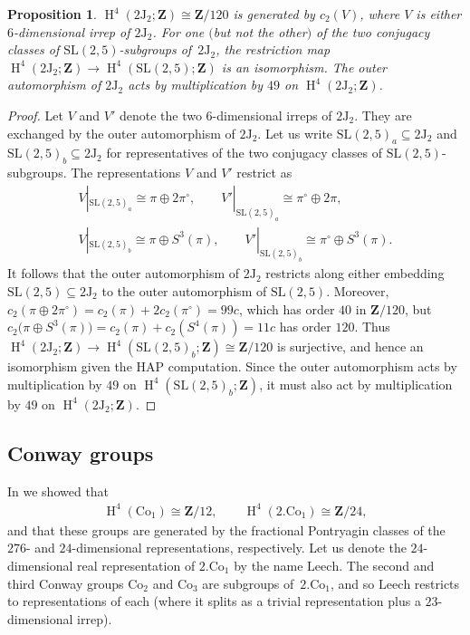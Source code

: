 \documentclass[pdftex]{sigma}
\numberwithin{equation}{section}
\newtheorem{Proposition}[Theorem]{Proposition}
 { \theoremstyle{definition}
\newtheorem{Remark}[Theorem]{Remark} }
\newcommand\bZ{\mathbf Z}
\newcommand\rJ{\mathrm J}
\DeclareMathOperator\homology{H}
\renewcommand\H{\homology}
\newcommand\<\langle
\renewcommand\>\rangle
\newcommand\Co{\mathrm{Co}}
\newcommand\Leech{\mathrm{Leech}}
\newcommand{\SL}{\mathrm{SL}}
\begin{document}
\begin{Proposition} \label{lem:J2} $\H^4(2\rJ_2;\bZ)\cong \bZ/120$ is generated by $c_2(V)$, where $V$ is either $6$-dimensional irrep of $2\rJ_2$. For one $($but not the other$)$ of the two conjugacy classes of $\SL(2,5)$-subgroups of~$2\rJ_2$, the restriction map $\H^4(2\rJ_2;\bZ) \to \H^4(\SL(2,5);\bZ)$ is an isomorphism. The outer automorphism of $2\rJ_2$ acts by multiplication by $49$ on $\H^4(2\rJ_2;\bZ)$.
\end{Proposition}
\begin{proof}

Let $V$ and $V'$ denote the two $6$-dimensional irreps of $2\rJ_2$. They are exchanged by the outer automorphism of $2\rJ_2$. Let us write $\SL(2,5)_a \subseteq 2\rJ_2$ and $\SL(2,5)_b \subseteq 2\rJ_2$ for representatives of the two conjugacy classes of $\SL(2,5)$-subgroups. The representations $V$ and $V'$ restrict as
 \begin{gather*} V|_{\SL(2,5)_a} \cong \pi \oplus 2\pi^{\circ}, \qquad V'|_{\SL(2,5)_a} \cong \pi^{\circ} \oplus 2\pi, \\
 V|_{\SL(2,5)_b} \cong \pi \oplus S^3(\pi), \qquad V'|_{\SL(2,5)_b} \cong \pi^{\circ} \oplus S^3(\pi).\end{gather*}
 It follows that the outer automorphism of $2\rJ_2$ restricts along either embedding $\SL(2,5) \subseteq 2\rJ_2$ to the outer automorphism of $\SL(2,5)$. Moreover, $c_2(\pi \oplus 2\pi^{\circ}) = c_2(\pi) + 2c_2(\pi^{\circ}) = 99c$, which has order $40$ in $\bZ/120$, but $c_2\big(\pi \oplus S^3(\pi)\big) = c_2(\pi) + c_2(S^4(\pi)) = 11 c$ has order $120$. Thus $\H^4(2\rJ_2;\bZ) \to \H^4(\SL(2,5)_b;\bZ) \cong \bZ/120$ is surjective, and hence an isomorphism
 given the HAP computation. Since the outer automorphism acts by multiplication by $49$ on $\H^4(\SL(2,5)_b;\bZ)$, it must also act by multiplication by $49$ on $\H^4(2\rJ_2;\bZ)$.
\end{proof}

\subsection{Conway groups}

In \cite[Theorems 0.1 and 5.3]{jft} we showed that
\begin{gather*} \H^4(\Co_1) \cong \bZ/12, \qquad \H^4(2.\Co_1) \cong \bZ/24,\end{gather*}
and that these groups are generated by the fractional Pontryagin classes of the $276$- and $24$-dimensional representations, respectively. Let us denote the $24$-dimensional real representation of $2.\Co_1$ by the name $\Leech$. The second and third Conway groups $\Co_2$ and $\Co_3$ are subgroups of~$2.\Co_1$, and so $\Leech$ restricts to representations of each (where it splits as a trivial representation plus a $23$-dimensional irrep).
\end{document}
